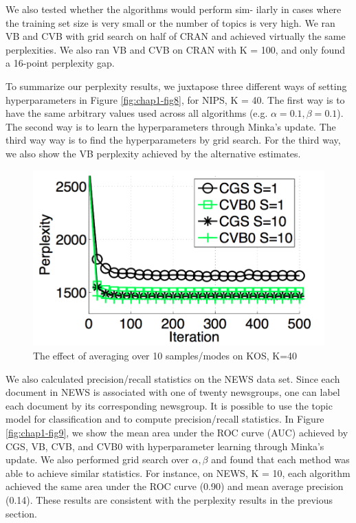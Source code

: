 We also tested whether the algorithms would perform sim- ilarly in cases where the training set size is very small or the number of topics is very high. We ran VB and CVB with grid search on half of CRAN and achieved virtually the same perplexities. We also ran VB and CVB on CRAN with K = 100, and only found a 16-point perplexity gap.

To summarize our perplexity results, we juxtapose three different ways of setting hyperparameters in Figure \ref{fig:chap1-fig8}, for NIPS, K = 40. The first way is to have the same arbitrary values used across all algorithms (e.g. $\alpha = 0.1, \beta = 0.1$). The second way is to learn the hyperparameters through Minka’s update. The third way way is to find the hyperparameters by grid search. For the third way, we also show the VB perplexity achieved by the alternative estimates.

\begin{figure}
  \centering
    \hspace*{-1.5cm}\includegraphics[height=0.33\textheight]{./Chap1/plots/figs/fig7.png}
  \caption{The effect of averaging over 10 samples/modes on KOS, K=40}
  \label{fig:chap1-fig7}
\end{figure}

We also calculated precision/recall statistics on the NEWS data set. Since each document in NEWS is associated with one of twenty newsgroups, one can label each document by its corresponding newsgroup. It is possible to use the topic model for classification and to compute precision/recall statistics. In Figure \ref{fig:chap1-fig9}, we show the mean area under the ROC curve (AUC) achieved by CGS, VB, CVB, and CVB0 with hyperparameter learning through Minka’s update. We also performed grid search over $\alpha, \beta$ and found that each method was able to achieve similar statistics. For instance, on NEWS, K = 10, each algorithm achieved the same area under the ROC curve (0.90) and mean average precision (0.14). These results are consistent with the perplexity results in the previous section.

